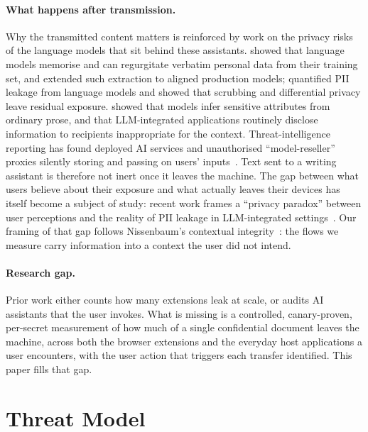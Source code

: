 \documentclass[sigconf,anonymous,review,balance=false]{acmart}
\begin{document}
\paragraph{What happens after transmission.}
Why the transmitted content matters is reinforced by work on the privacy risks of the
language models that sit behind these assistants. \citet{carlini2021extracting} showed
that language models memorise and can regurgitate verbatim personal data from their
training set, and \citet{nasr2025scalable} extended such extraction to aligned production
models; \citet{lukas2023pii} quantified PII leakage from language models and showed that
scrubbing and differential privacy leave residual exposure. \citet{staab2024beyond} showed
that models infer sensitive attributes from ordinary prose, and
\citet{mireshghallah2024cansecret} that LLM-integrated applications routinely disclose
information to recipients inappropriate for the context. Threat-intelligence reporting has
found deployed AI services and unauthorised ``model-reseller'' proxies silently storing and
passing on users' inputs~\cite{anthropic2026threats}. Text sent to a writing assistant is
therefore not inert once it leaves the machine. The gap between what users believe about
their exposure and what actually leaves their devices has itself become a subject of study:
recent work frames a ``privacy paradox'' between user perceptions and the reality of PII
leakage in LLM-integrated settings~\cite{privacyparadox2026}. Our framing of that gap
follows Nissenbaum's contextual integrity~\cite{nissenbaum2004contextual}: the flows we
measure carry information into a context the user did not intend.

\paragraph{Research gap.}
Prior work either counts how many extensions leak at scale, or audits AI assistants that
the user invokes. What is missing is a controlled, canary-proven, per-secret measurement of
how much of a single confidential document leaves the machine, across both the browser
extensions and the everyday host applications a user encounters, with the user action that
triggers each transfer identified. This paper fills that gap.

\section{Threat Model}
\label{sec:threat}
\end{document}
